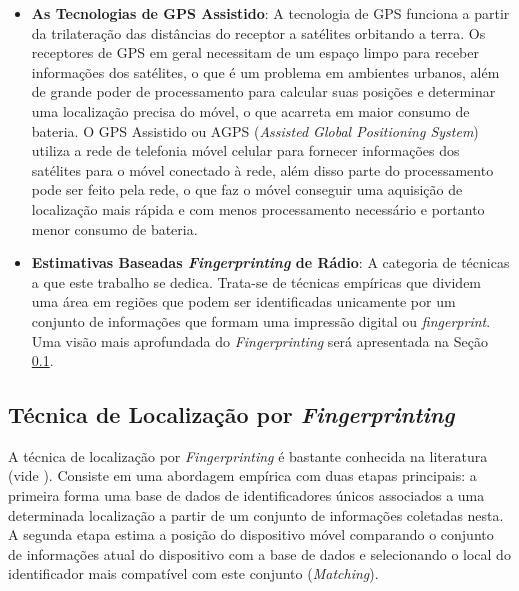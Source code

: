 \documentclass[12pt]{article}
\begin{document}
\begin{itemize}
        \item{\textbf{As Tecnologias de GPS Assistido}}: A tecnologia de GPS funciona a partir da trilateração das distâncias do receptor a satélites orbitando a terra. Os receptores de GPS em geral necessitam de um espaço limpo para receber informações dos satélites, o que é um problema em ambientes urbanos, além de grande poder de processamento para calcular suas posições e determinar uma localização precisa do móvel, o que acarreta em maior consumo de bateria. O GPS Assistido ou AGPS (\textit{Assisted Global Positioning System}) utiliza a rede de telefonia móvel celular para fornecer informações dos satélites para o móvel conectado à rede, além disso parte do processamento pode ser feito pela rede, o que faz o móvel conseguir uma aquisição de localização mais rápida e com menos processamento necessário e portanto menor consumo de bateria.
        
        \item{\textbf{Estimativas Baseadas \textit{Fingerprinting} de Rádio}}: A categoria de técnicas a que este trabalho se dedica. Trata-se de técnicas empíricas que dividem uma área em regiões que podem ser identificadas unicamente por um conjunto de informações que formam uma impressão digital ou \textit{fingerprint}. Uma visão mais aprofundada do \textit{Fingerprinting} será apresentada na Seção \ref{sec:fingerprinting}. 
    
        \end{itemize}

        \subsection{Técnica de Localização por \textit{Fingerprinting}}
        \label{sec:fingerprinting}
    
        A técnica de localização por \textit{Fingerprinting} é bastante conhecida na literatura (vide \cite{surveyFingerprinting2016}). Consiste em uma abordagem empírica com duas etapas principais: a primeira forma uma base de dados de identificadores únicos associados a uma determinada localização a partir de um conjunto de informações coletadas nesta. A segunda etapa estima a posição do dispositivo móvel comparando o conjunto de informações atual do dispositivo com a base de dados e selecionando o local do identificador mais compatível com este conjunto (\textit{Matching}).

\end{document}
